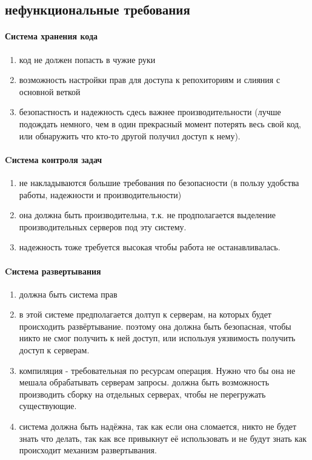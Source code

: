 \documentclass{article}
\begin{document}
\subsection{нефункциональные требования}
\paragraph{Система хранения кода}
\begin{enumerate}
    \item{код не должен попасть в чужие руки}
    \item{возможность настройки прав для доступа к репохиториям и слияния с основной веткой}
    \item{безопастность и надежность сдесь важнее производительности (лучше подождать немного, чем в один прекрасный момент потерять весь свой код, или обнаружить что кто-то другой получил доступ к нему).}
\end{enumerate}

\paragraph{Cистема контроля задач}
\begin{enumerate}
    \item{не накладываются большие требования по безопасности (в пользу удобства работы, надежности и производительности)}
    \item{она должна быть производительна, т.к. не продполагается выделение производительных серверов под эту систему.}
    \item{надежность тоже требуется высокая чтобы работа не останавливалась.}
\end{enumerate}

\paragraph{Cистема развертывания}
\begin{enumerate}  
    \item{должна быть система прав}
   
    \item{в этой системе предполагается долтуп к серверам, на которых будет происходить развёртывание.
    поэтому она должна быть безопасная, чтобы никто не смог получить к ней доступ, или используя уязвимость
    получить доступ к серверам.}
   
    \item{компиляция - требовательная по ресурсам операция. Нужно что бы она не мешала обрабатывать серверам запросы.
    должна быть возможность производить сборку на отдельных серверах, чтобы не перегружать существующие.}
   
    \item{система должна быть надёжна, так как если она сломается, никто не будет знать что делать, так как все привыкнут
    её использовать и не будут знать как происходит механизм развертывания.}
\end{enumerate}   
\end{document}
